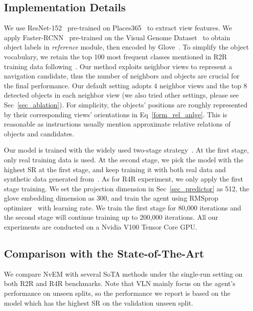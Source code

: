\documentclass[sigconf]{acmart}
\begin{document}
\subsection{Implementation Details}
We use ResNet-152~\cite{he2016resnet} pre-trained on Places365~\cite{zhou2018places} to extract view features. 
We apply Faster-RCNN~\cite{ren2015faster-rcnn} pre-trained on the Visual Genome Dataset~\cite{ranjay2017genome} to obtain object labels in \textit{reference} module, then encoded by Glove~\cite{jeffrey2014glove}. 
To simplify the object vocabulary, we retain the top 100 most frequent classes mentioned in R2R training data following~\cite{hong2020relgraph}. 
Our method exploits neighbor views to represent a navigation candidate, thus the number of neighbors and objects are crucial for the final performance. 
Our default setting adopts 4 neighbor views and the top 8 detected objects in each neighbor view (we also tried other settings, please see Sec~\ref{sec_ablation}).
For simplicity, the objects' positions are roughly represented by their corresponding views' orientations in Eq~\eqref{form_rel_anlge}. This is reasonable as instructions usually mention approximate relative relations of objects and candidates. 

Our model is trained with the widely used two-stage strategy~\cite{tan2019envdrop}. At the first stage, only real training data is used.
At the second stage, we pick the model with the highest SR at the first stage, and keep training it with both real data and synthetic data generated from~\cite{fried2018speaker}.
As for R4R experiment, we only apply the first stage training. We set the projection dimension  in Sec~\ref{sec_predictor} as 512, the glove embedding dimension as 300, and train the agent using RMSprop optimizer~\cite{ruder2016optim} with  learning rate. 
We train the first stage for 80,000 iterations and the second stage will continue training up to 200,000 iterations. All our experiments are conducted on a Nvidia V100 Tensor Core GPU.


\subsection{Comparison with the State-of-The-Art}
We compare NvEM with several SoTA methods under the single-run setting on both R2R and R4R benchmarks. 
Note that VLN mainly focus on the agent's performance on unseen splits, so the performance we report is based on the model which has the highest {SR} on the validation unseen split.
\end{document}
